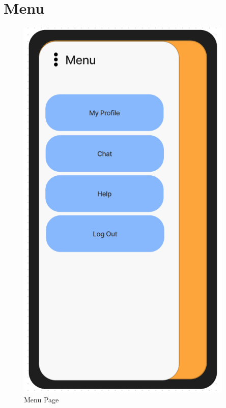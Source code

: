 \documentclass[title page]{article}
\begin{document}
\section{Menu}
\begin{figure}[!h]
    \begin{center}
          \includegraphics[height=19cm]{menu.png}
          \caption{Menu Page}
          \label{fig:menu}
    \end{center}
\end{figure}
\end{document}
